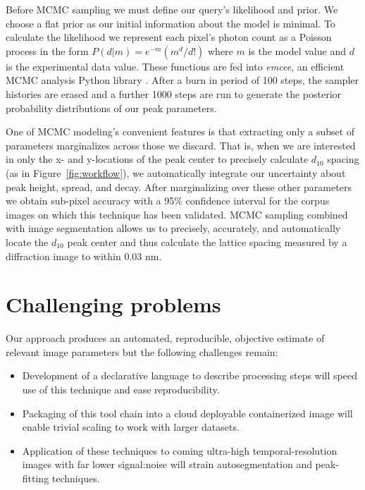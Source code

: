 \documentclass{sig-alternate}
\begin{document}
Before MCMC sampling we must define our query's likelihood and prior.
We choose a flat prior as our initial information about the model is
minimal. To calculate the likelihood we represent each pixel's photon
count as a Poisson process in the form $P(d|m)=e^{-m}
\left(m^{d}/d!\right)$ where $m$ is the model value and $d$ is the
experimental data value. These functions are fed into \textit{emcee},
an efficient MCMC analysis Python library \cite{ForemanMackey2013}.
After a burn in period of 100 steps, the sampler histories are erased
and a further 1000 steps are run to generate the posterior probability
distributions of our peak parameters. 

One of MCMC modeling's convenient features is that extracting only a
subset of parameters marginalizes across those we discard. That is,
when we are interested in only the x- and y-locations of the peak
center to precisely calculate $d_{10}$ spacing (as in
Figure~\ref{fig:workflow}), we automatically integrate our uncertainty
about peak height, spread, and decay. After marginalizing over these
other parameters we obtain sub-pixel accuracy with a 95\% confidence
interval for the corpus images on which this technique has been
validated.  MCMC sampling combined with image segmentation allows us
to precisely, accurately, and automatically locate the $d_{10}$ peak
center and thus calculate the lattice spacing measured by a
diffraction image to within 0.03 nm.


\section{Challenging problems}
\label{sec:challenges}


Our approach produces an automated, reproducible, objective estimate of relevant image parameters but the following challenges remain:

\begin{itemize}[noitemsep]
\item Development of a declarative language to describe processing steps will speed use of this technique and ease reproducibility. 
\item Packaging of this tool chain into a cloud deployable
containerized image will enable trivial scaling to work with larger
datasets. 
\item Application of these techniques to coming ultra-high temporal-resolution images with far lower signal:noise will strain autosegmentation and peak-fitting techniques. 
\end{itemize}
\end{document}
